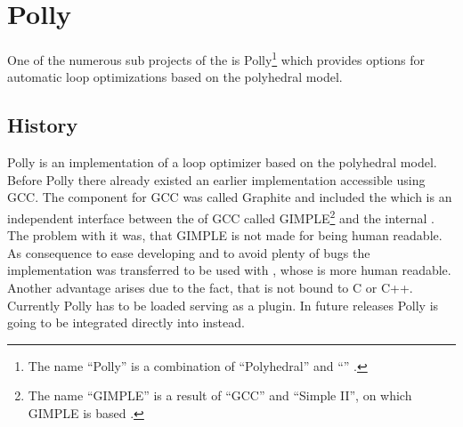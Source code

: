 \chapter{Polly}
One of the numerous sub projects of the \llvm is Polly\footnote{The name \enquote{Polly} is a combination of \enquote{Polyhedral} and \enquote{\llvm} \cite{PollyGrosser}.} which provides options for automatic loop optimizations based on the polyhedral model.

\section{History}
Polly is an implementation of a loop optimizer based on the polyhedral model.\\
Before Polly there already existed an earlier implementation accessible using GCC.
The component for GCC was called Graphite \cite{gccGraphite} and included the \pcp \cite{GrosserGraphite, GrosserGraphiteDesign} which is an independent interface between the \ir of GCC called GIMPLE\footnote{The name \enquote{GIMPLE} is a result of \enquote{GCC} and \enquote{Simple II}, on which GIMPLE is based \cite{GenericGimple}.} and the internal \ir \gpoly.
The problem with it was, that GIMPLE is not made for being human readable.
As consequence to ease developing and to avoid plenty of bugs the implementation was transferred to be used with \llvm, whose \ir is more human readable.
Another advantage arises due to the fact, that \llvm is not bound to C or C++.
Currently Polly has to be loaded serving as a \llvm plugin.
In future releases Polly is going to be integrated directly into \llvm instead.


